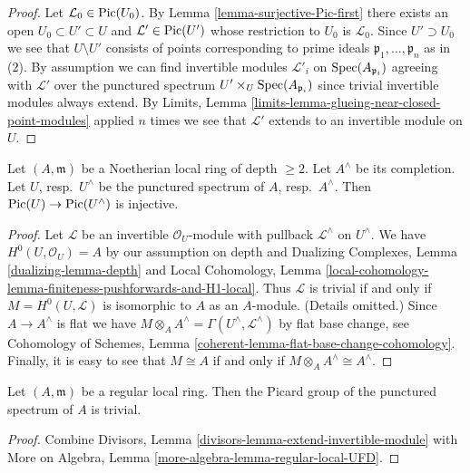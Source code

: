 \begin{proof}
Let $\mathcal{L}_0 \in \mathop{\mathrm{Pic}}\nolimits(U_0)$. By
Lemma \ref{lemma-surjective-Pic-first}
there exists an open $U_0 \subset U' \subset U$
and $\mathcal{L}' \in \mathop{\mathrm{Pic}}\nolimits(U')$ whose restriction
to $U_0$ is $\mathcal{L}_0$.
Since $U' \supset U_0$ we see that $U \setminus U'$
consists of points corresponding to prime ideals
$\mathfrak p_1, \ldots, \mathfrak p_n$ as in (2).
By assumption we can find invertible modules
$\mathcal{L}'_i$ on $\mathop{\mathrm{Spec}}(A_{\mathfrak p_i})$ agreeing with
$\mathcal{L}'$ over the punctured spectrum
$U' \times_U \mathop{\mathrm{Spec}}(A_{\mathfrak p_i})$ since
trivial invertible modules always extend.
By Limits, Lemma \ref{limits-lemma-glueing-near-closed-point-modules}
applied $n$ times we see that $\mathcal{L}'$ extends to an
invertible module on $U$.
\end{proof}

\begin{lemma}
\label{lemma-local-pic-to-completion}
Let $(A, \mathfrak m)$ be a Noetherian local ring of depth $\geq 2$.
Let $A^\wedge$ be its completion. Let $U$, resp.\ $U^\wedge$
be the punctured spectrum of $A$, resp.\ $A^\wedge$. Then
$\mathop{\mathrm{Pic}}\nolimits(U) \to \mathop{\mathrm{Pic}}\nolimits(U^\wedge)$ is injective.
\end{lemma}

\begin{proof}
Let $\mathcal{L}$ be an invertible $\mathcal{O}_U$-module
with pullback $\mathcal{L}^\wedge$ on $U^\wedge$.
We have $H^0(U, \mathcal{O}_U) = A$ by our assumption on depth and
Dualizing Complexes, Lemma \ref{dualizing-lemma-depth} and
Local Cohomology, Lemma
\ref{local-cohomology-lemma-finiteness-pushforwards-and-H1-local}.
Thus $\mathcal{L}$ is trivial if and only if
$M = H^0(U, \mathcal{L})$ is isomorphic to $A$ as an $A$-module.
(Details omitted.) Since $A \to A^\wedge$ is flat
we have $M \otimes_A A^\wedge = \Gamma(U^\wedge, \mathcal{L}^\wedge)$
by flat base change, see
Cohomology of Schemes, Lemma \ref{coherent-lemma-flat-base-change-cohomology}.
Finally, it is easy to see that $M \cong A$ if and only if
$M \otimes_A A^\wedge \cong A^\wedge$.
\end{proof}

\begin{lemma}
\label{lemma-trivial-local-pic-regular}
Let $(A, \mathfrak m)$ be a regular local ring. Then the Picard
group of the punctured spectrum of $A$ is trivial.
\end{lemma}

\begin{proof}
Combine Divisors, Lemma \ref{divisors-lemma-extend-invertible-module}
with More on Algebra, Lemma \ref{more-algebra-lemma-regular-local-UFD}.
\end{proof}

